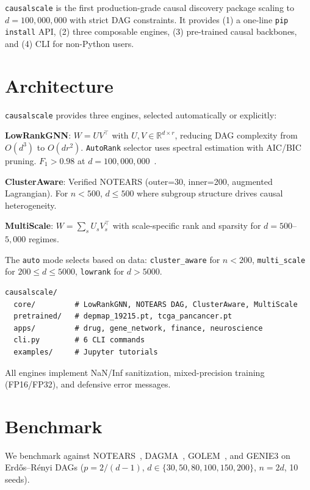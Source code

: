 \documentclass[11pt,twoside]{article}
\begin{document}
\texttt{causalscale} is the first production-grade causal discovery package scaling to
$d=100{,}000{,}000$ with strict DAG constraints. It provides (1) a one-line \texttt{pip install} API,
(2) three composable engines, (3) pre-trained causal backbones, and (4) CLI for non-Python users.

\section{Architecture}

\texttt{causalscale} provides three engines, selected automatically or explicitly:

\noindent\textbf{LowRankGNN}: $W=UV^\top$ with $U,V\in\mathbb{R}^{d\times r}$, reducing DAG
complexity from $O(d^3)$ to $O(dr^2)$. \texttt{AutoRank} selector uses spectral estimation
with AIC/BIC pruning. $F_1>0.98$ at $d=100{,}000{,}000$~\citep{gao2026lowranktheory}.

\noindent\textbf{ClusterAware}: Verified NOTEARS (outer=30, inner=200, augmented Lagrangian).
For $n<500$, $d\le500$ where subgroup structure drives causal heterogeneity.

\noindent\textbf{MultiScale}: $W=\sum_s U_sV_s^\top$ with scale-specific rank and sparsity
for $d=500$--$5{,}000$ regimes.

The \texttt{auto} mode selects based on data: \texttt{cluster\_aware} for $n<200$,
\texttt{multi\_scale} for $200\le d\le5000$, \texttt{lowrank} for $d>5000$.

\begin{verbatim}
causalscale/
  core/         # LowRankGNN, NOTEARS DAG, ClusterAware, MultiScale
  pretrained/   # depmap_19215.pt, tcga_pancancer.pt
  apps/         # drug, gene_network, finance, neuroscience
  cli.py        # 6 CLI commands
  examples/     # Jupyter tutorials
\end{verbatim}

All engines implement NaN/Inf sanitization, mixed-precision training (FP16/FP32),
and defensive error messages.

\section{Benchmark}

We benchmark against NOTEARS~\citep{zheng2018dag}, DAGMA~\citep{bello2022dagma},
GOLEM~\citep{ng2020golem}, and GENIE3 on Erd\H{o}s--R\'{e}nyi DAGs
($p=2/(d-1)$, $d\in\{30,50,80,100,150,200\}$, $n=2d$, 10 seeds).
\end{document}
